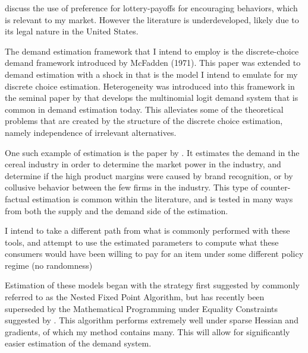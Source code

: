 \documentclass[12pt]{paper}
\begin{document}
\cite{LitReview} discuss the use of preference for lottery-payoffs for
encouraging behaviors, which is relevant to my market. However the
literature is underdeveloped, likely due to its legal nature in the
United States.


The demand estimation framework that I intend to employ is the
discrete-choice demand framework introduced by McFadden (1971). This
paper was extended to demand estimation with a shock in \cite{Berry1994}
that is the model I intend to emulate for my discrete choice
estimation. Heterogeneity was introduced into this framework in the
seminal paper by \cite*{BLP} that develops the multinomial logit
demand system that is common in demand estimation today. This
alleviates some of the theoretical problems that are created by the
structure of the discrete choice estimation, namely independence of
irrelevant alternatives. 

One such example of estimation is the paper by \cite*{Cereal}. It
estimates the demand in the cereal industry in order to determine the
market power in the industry, and determine if the high product
margins were caused by brand recognition, or by collusive behavior
between the few firms in the industry. This type of counter-factual
estimation is common within the literature, and is tested in many ways
from both the supply and the demand side of the estimation.

I intend to take a different path from what is commonly performed with
these tools, and attempt to use the estimated parameters to compute
what these consumers would have been willing to pay for an item under
some different policy regime (no randomness)

Estimation of these models began with the strategy first suggested by
\cite{BLP} commonly referred to as the Nested Fixed Point Algorithm,
but has recently been superseded by the Mathematical Programming under
Equality Constraints suggested by \cite*{MPEC}. This algorithm
performs extremely well under sparse Hessian and gradients, of which
my method contains many. This will allow for significantly easier
estimation of the demand system.
\end{document}
